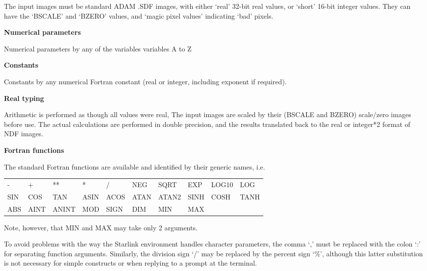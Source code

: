 \begin{small}
{{ The input images must be standard \starman ADAM .SDF images, with
  either `real' 32-bit real values, or `short' 16-bit integer values.
  They can have the `BSCALE' and `BZERO' values, and `magic pixel values'
  indicating `bad' pixels.

{\hspace*{4ex} \bf  Numerical parameters}

  Numerical parameters by any of the variables variables A to Z

{\hspace*{4ex} \bf  Constants}

  Constants by any numerical Fortran constant (real or integer,
  including exponent if required).

{\hspace*{4ex} \bf  Real typing}

  Arithmetic is performed as though all values were real, The
  input images are scaled by their (BSCALE and BZERO) scale/zero
  images before use. The actual calculations are performed in
  double precision, and the results translated back to the
  real or integer*2 format of \starman NDF images.

{\hspace*{4ex} \bf  Fortran functions}

   The standard Fortran functions are available and identified
    by their generic names, i.e.

\begin{tabular}{llllllllll}
        -     &    +      &   **     &   *     &  /     & NEG   &
        SQRT  &    EXP    &   LOG10  &   LOG   \\
        SIN   &    COS    &   TAN    &   ASIN  &  ACOS  & ATAN  &
        ATAN2 &    SINH   &   COSH   &   TANH  \\
        ABS   &    AINT   &   ANINT  &    MOD  &  SIGN  & DIM   &
        MIN   &    MAX    &          &        \\
\end{tabular}

    Note, however, that MIN and MAX may take only 2 arguments.

    To avoid problems with the way the Starlink environment
    handles character parameters, the comma `,' must be replaced with
    the colon `:' for separating function arguments. Similarly, the
    division sign `/' may be replaced by the percent sign `\%', although
    this latter substitution is not necessary for simple constructs or
    when replying to a prompt at the terminal.

}}
\end{small}
